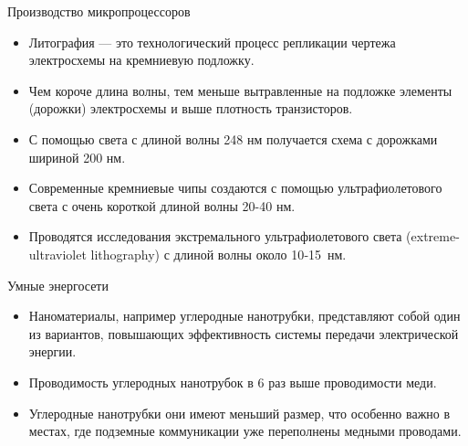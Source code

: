 \documentclass[_Venture_p3.tex]{subfiles}
\begin{document}
\begin{frame}[allowframebreaks]{Производство микропроцессоров}
\begin{itemize}
	\item Литография — это технологический процесс репликации чертежа электросхемы на кремниевую подложку. 
	\item Чем короче длина волны, тем меньше вытравленные на подложке элементы (дорожки) электросхемы и выше плотность транзисторов.
	\item С помощью света с длиной волны 248 нм получается схема с дорожками шириной 200 нм.
	
	\pagebreak
	\item Современные кремниевые чипы создаются с помощью ультрафиолетового света с очень короткой длиной волны 20-40 нм. 
	\item Проводятся исследования экстремального ультрафиолетового света (extreme-ultraviolet lithography) с длиной волны около 10‑15 нм.
\end{itemize}
\end{frame}

\begin{frame}{Умные энергосети}
\begin{itemize}
	\item Наноматериалы, например углеродные нанотрубки, представляют собой один из вариантов, повышающих эффективность системы передачи электрической энергии. 
	
	\item Проводимость углеродных нанотрубок в 6 раз выше проводимости меди. 
	
	\item Углеродные нанотрубки они имеют меньший размер, что особенно важно в местах, где подземные коммуникации уже переполнены медными проводами.
\end{itemize}
\end{frame}
\end{document}
